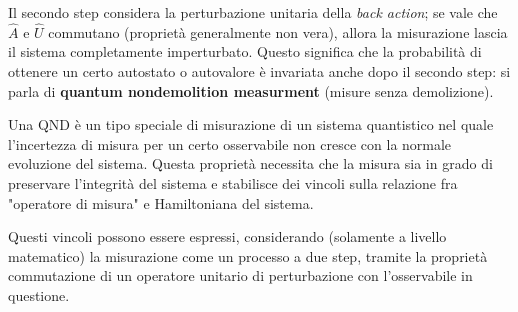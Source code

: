 \noindent
Il secondo step considera la perturbazione unitaria della \textit{back action}; se vale che $\hat A$ e $\hat U$ commutano (proprietà generalmente non vera), allora la misurazione lascia il sistema completamente imperturbato. Questo significa che la probabilità di ottenere un certo autostato o autovalore è invariata anche dopo il secondo step: si parla di \textbf{quantum nondemolition measurment} (misure senza demolizione).

\begin{definizione}
    Una QND è un tipo speciale di misurazione di un sistema quantistico nel quale l'incertezza di misura per un certo osservabile non cresce con la normale evoluzione del sistema. Questa proprietà necessita che la misura sia in grado di preservare l'integrità del sistema e stabilisce dei vincoli sulla relazione fra "operatore di misura" e Hamiltoniana del sistema.
    
    \noindent Questi vincoli possono essere espressi, considerando (solamente a livello matematico) la misurazione come un processo a due step, tramite la proprietà commutazione di un operatore unitario di perturbazione con l'osservabile in questione.
\end{definizione}